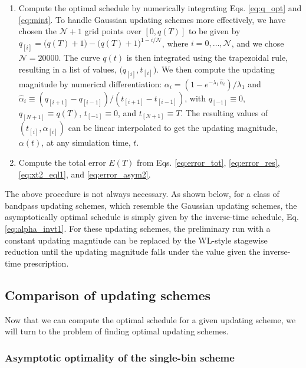 \documentclass[reprint, superscriptaddress, floatfix]{revtex4-1}
\newcommand{\Err}{E}
\begin{document}
\begin{enumerate}
\item \label{step:alpha}
Compute the optimal schedule by
  numerically integrating Eqs. \eqref{eq:q_opt} and \eqref{eq:mint}.
%
To handle Gaussian updating schemes more effectively,
  we have chosen the $\mathcal N+1$ grid points over $[0, q(T)]$ to be given by
  $q_{[i]} = \bigl(q(T) + 1\bigr) - \bigl(q(T)+1\bigr)^{1-i/\mathcal N}$,
  where $i = 0, \dots, \mathcal N$, and we chose $\mathcal N=20000$.
%
The curve $q(t)$ is then integrated
  using the trapezoidal rule\cite{press3rd},
  resulting in a list of values, $\bigl(q_{[i]}, t_{[i]} \bigr)$.
%
We then compute the updating magnitude by numerical differentiation:
  $\alpha_i = (1 - e^{-\lambda_1 \, \hat \alpha_i})/\lambda_1$
  and
  $\hat \alpha_i \equiv (q_{[i+1]} - q_{[i-1]}) / (t_{[i+1]} - t_{[i-1]})$,
  with
  $q_{[ -1]} \equiv 0$,
  $q_{[N+1]} \equiv q(T)$,
  $t_{[ -1]} \equiv 0$, and
  $t_{[N+1]} \equiv T$.
%
The resulting values of $(t_{[i]}, \alpha_{[i]})$
  can be linear interpolated
  to get the updating magnitude, $\alpha(t)$, at any simulation time, $t$.


\item
  Compute the total error $\Err(T)$ from
Eqs. \eqref{eq:error_tot},
  \eqref{eq:error_res},
  \eqref{eq:xt2_eql1},
  and
  \eqref{eq:error_asym2}.

\end{enumerate}

The above procedure is not always necessary.
%
As shown below, for a class of bandpass updating schemes,
  which resemble the Gaussian updating schemes,
  the asymptotically optimal schedule
  is simply given by the inverse-time schedule, Eq. \eqref{eq:alpha_invt1}.
%
For these updating schemes,
  the preliminary run with a constant updating magntiude
  can be replaced by the WL-style stagewise reduction
  until the updating magnitude falls under
  the value given the inverse-time prescription\cite{
    belardinelli2007, *belardinelli2007jcp, *belardinelli2008, *belardinelli2016}.



\subsection{\label{sec:cmpschemes}
Comparison of updating schemes}


Now that we can compute the optimal schedule
for a given updating scheme,
we will turn to the problem of finding
optimal updating schemes.


\subsubsection{\label{sec:optWL}
Asymptotic optimality of the single-bin scheme}
\end{document}
